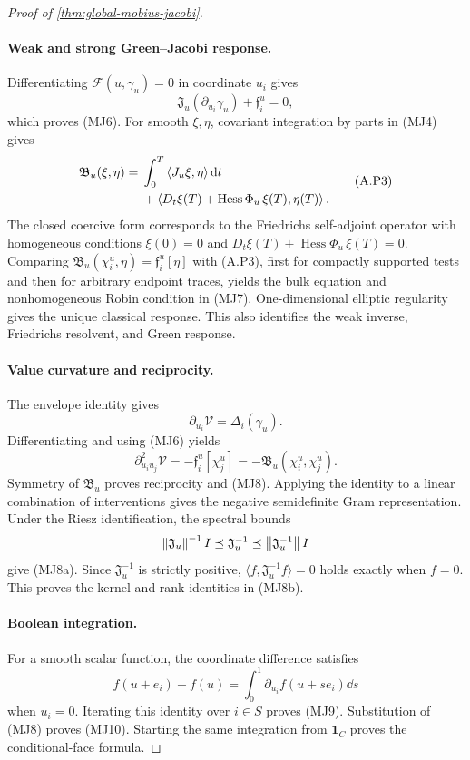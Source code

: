 \begin{proof}[Proof of \cref{thm:global-mobius-jacobi}]
\paragraph{Weak and strong Green--Jacobi response.}
Differentiating \(\mathscr F(u,\gamma_u)=0\) in coordinate \(u_i\) gives
\[
  \mathfrak J_u(\partial_{u_i}\gamma_u)+\mathfrak f_i^u=0,
\]
which proves (MJ6).  For smooth \(\xi,\eta\), covariant integration by parts
in (MJ4) gives
\begin{equation}
\begin{aligned}
  \mathfrak B_u(\xi,\eta)
  ={}&\int_0^T\left\langle J_u\xi,\eta\right\rangle\mathrm d t\\
  &+\left\langle D_t\xi(T)+\operatorname{Hess}\Phi_u\,\xi(T),\eta(T)\right\rangle.
\end{aligned}
\tag{A.P3}
\end{equation}
The closed coercive form corresponds to the Friedrichs self-adjoint operator
with homogeneous conditions
\(\xi(0)=0\) and
\(D_t\xi(T)+\operatorname{Hess}\Phi_u\,\xi(T)=0\).  Comparing
\(\mathfrak B_u(\chi_i^u,\eta)=\mathfrak f_i^u[\eta]\) with (A.P3), first for
compactly supported tests and then for arbitrary endpoint traces, yields the
bulk equation and nonhomogeneous Robin condition in (MJ7).  One-dimensional
elliptic regularity gives the unique classical response.  This also identifies
the weak inverse, Friedrichs resolvent, and Green response.

\paragraph{Value curvature and reciprocity.}
The envelope identity gives
\[
  \partial_{u_i}\mathcal V=\Delta_i(\gamma_u).
\]
Differentiating and using (MJ6) yields
\[
  \partial_{u_i u_j}^2\mathcal V
  =-\mathfrak f_i^u[\chi_j^u]
  =-\mathfrak B_u(\chi_i^u,\chi_j^u).
\]
Symmetry of \(\mathfrak B_u\) proves reciprocity and (MJ8).  Applying the
identity to a linear combination of interventions gives the negative
semidefinite Gram representation.  Under the Riesz identification, the
spectral bounds
\[
  \left\lVert \mathfrak J_u\right\rVert^{-1}I
  \preceq\mathfrak J_u^{-1}
  \preceq\left\lVert \mathfrak J_u^{-1}\right\rVert I
\]
give (MJ8a).  Since \(\mathfrak J_u^{-1}\) is strictly positive,
\(\langle f,\mathfrak J_u^{-1}f\rangle=0\) holds exactly when \(f=0\).
This proves the kernel and rank identities in (MJ8b).

\paragraph{Boolean integration.}
For a smooth scalar function, the coordinate difference satisfies
\[
  f(u+e_i)-f(u)=\int_0^1\partial_{u_i}f(u+se_i)\dd s
\]
when \(u_i=0\).  Iterating this identity over \(i\in S\) proves (MJ9).
Substitution of (MJ8) proves (MJ10).  Starting the same integration from
\(\mathbf1_C\) proves the conditional-face formula.
\end{proof}

